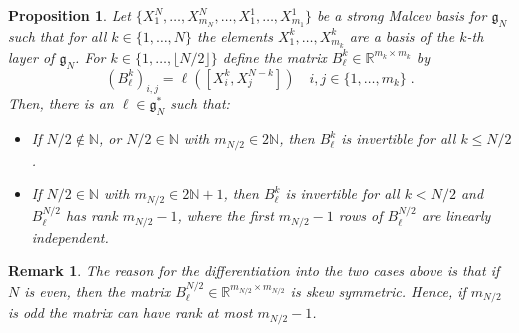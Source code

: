 \documentclass[pdflatex,sn-mathphys-num]{sn-jnl}
\theoremstyle{thmstyletwo}
\theoremstyle{thmstyleone}
\newtheorem{proposition}[definition]{Proposition}
\theoremstyle{thmstyletwo}
\newtheorem{remark}[definition]{Remark}
\newcommand{\fancyg}{\mathfrak{g}}
\begin{document}
	\begin{proposition}\label{prop: existence of invertible matrix}
		Let $\{X_1^N, \ldots, X_{m_N}^N, \ldots,X_1^1, \ldots, X_{m_1}^1\}$ be a strong Malcev basis for $\fancyg_N$ such that for all $k \in \{1, \ldots, N\}$ the elements $X_1^k, \ldots, X_{m_k}^k$ are a basis of the $k$-th layer of $\fancyg_N$. For $k \in \{1,\ldots, \lfloor N/2 \rfloor\}$ define the matrix $B_{\ell}^k \in \mathbb{R}^{m_k\times m_k}$ by
		\[(B_{\ell}^k)_{i,j} = \ell([X_i^k,X_j^{N-k}]) \quad i,j \in \{1, \ldots, m_k\} \;.\]
		Then, there is an $\ell \in \fancyg_N^*$ such that:
		\begin{itemize}
			\item[i)] If $N/2 \notin \mathbb{N}$, or $N/2 \in \mathbb{N}$ with $m_{N/2} \in 2\mathbb{N}$, then $B_{\ell}^k$ is invertible for all $k \leq N/2$.
			\item[ii)] If $N/2 \in  \mathbb{N}$ with $m_{N/2} \in 2\mathbb{N}+1$, then $B_{\ell}^k$ is invertible for all $k<N/2$ and $B_{\ell}^{N/2}$ has rank $m_{N/2}-1$, where the first $m_{N/2}-1$ rows of $B_{\ell}^{N/2}$ are linearly independent.
		\end{itemize}
	\end{proposition}
	\begin{remark}
		The reason for the differentiation into the two cases above is that if $N$ is even, then the matrix $B_{\ell}^{N/2} \in \mathbb{R}^{m_{N/2}\times m_{N/2}}$ is skew symmetric. Hence, if $ m_{N/2}$ is odd the matrix can have rank at most  $m_{N/2}-1$.
	\end{remark}
\end{document}
